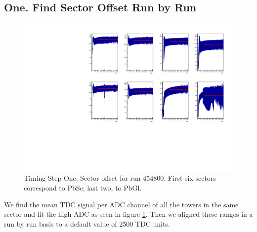 \documentclass{article}
\begin{document}
\subsection{One. Find Sector Offset Run by Run}
\begin{figure}
\includegraphics[width=\textwidth]{fig_pi0vn/454800.pdf}
\caption{Timing Step One. Sector offset for run 454800. First six sectors correspond to PbSc; last two, to PbGl.}
\label{fig.tim.one}
\end{figure}
We find the mean TDC signal per ADC channel of all the towers in the same sector and fit the high ADC as seen in figure \ref{fig.tim.one}.
Then we aligned these ranges in a run by run basis to a default value of 2500 TDC units.
\end{document}
